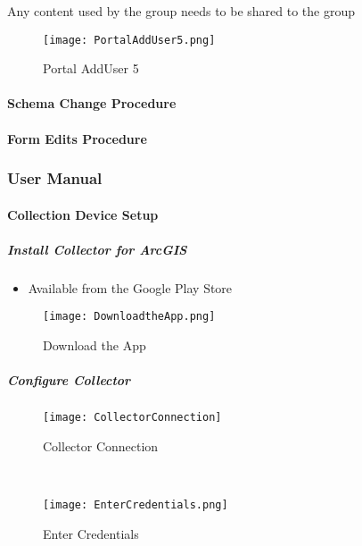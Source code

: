  \noindent Any content used by the group needs to be shared to the group
 \vspace{.5in}

 \begin{figure}[h!]
 \centering
     \texttt{[image: PortalAddUser5.png]}
 \caption{Portal AddUser 5}
 \end{figure}
 \clearpage
 \paragraph[Schema Change Procedure]{\Large Schema Change Procedure}
 \clearpage
 \paragraph[Form Edits Procedure]{\Large Form Edits Procedure}
 \clearpage
 \subsubsection[User Manual]{\Large User Manual}
 \paragraph{Collection Device Setup}
 \subparagraph{Install Collector for ArcGIS}
 \begin{itemize}
 \item Available from the Google Play Store
 \end{itemize}
 \begin{figure}[h!]
 \centering
     \texttt{[image: DownloadtheApp.png]}
 \caption{Download the App}
 \end{figure}
 \clearpage
 \subparagraph[Configure Collector]{\Large Configure Collector}
 \begin{wrapfigure}{r}{0.5\textwidth}
 \centering
 \texttt{[image: CollectorConnection]}
 \caption{Collector Connection}

 \HRule \\[.4cm] %
 \vspace{.1in}

     \texttt{[image: EnterCredentials.png]}
 \vspace{-.1in}

 \caption{Enter Credentials}
 \end{wrapfigure}

